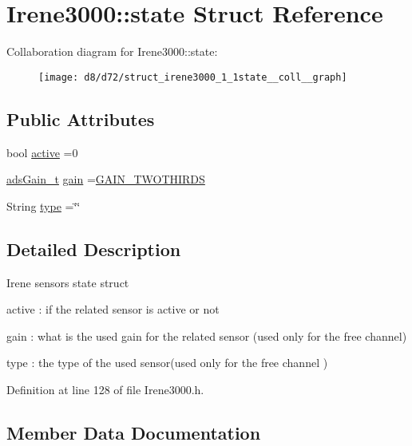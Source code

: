 \hypertarget{struct_irene3000_1_1state}{}\section{Irene3000\+:\+:state Struct Reference}
\label{struct_irene3000_1_1state}


Collaboration diagram for Irene3000\+:\+:state\+:\nopagebreak
\begin{figure}[H]
\begin{center}
\leavevmode
\texttt{[image: d8/d72/struct\_irene3000\_1\_1state\_\_coll\_\_graph]}
\end{center}
\end{figure}
\subsection*{Public Attributes}
\begin{DoxyCompactItemize}
\item 
bool \hyperlink{struct_irene3000_1_1state_a879828ace7e7a7bc91ff703bfee36599}{active} =0
\item 
\hyperlink{_cool_adafruit___a_d_s1015_8h_a3d6c0e15829a207b9155890811fa4781}{ads\+Gain\+\_\+t} \hyperlink{struct_irene3000_1_1state_a1ecf69d38cb31ecaf6b3602a3f3e93cb}{gain} =\hyperlink{_cool_adafruit___a_d_s1015_8h_a3d6c0e15829a207b9155890811fa4781a879d688347ec0bf159fe1278db602f68}{G\+A\+I\+N\+\_\+\+T\+W\+O\+T\+H\+I\+R\+DS}
\item 
String \hyperlink{struct_irene3000_1_1state_a9897a7e02727db6351d44006eec73799}{type} =\char`\"{}\char`\"{}
\end{DoxyCompactItemize}


\subsection{Detailed Description}
Irene sensors state struct

active \+: if the related sensor is active or not

gain \+: what is the used gain for the related sensor (used only for the free channel)

type \+: the type of the used sensor(used only for the free channel ) 

Definition at line 128 of file Irene3000.\+h.



\subsection{Member Data Documentation}
\mbox{\label{struct_irene3000_1_1state_a879828ace7e7a7bc91ff703bfee36599}} 
